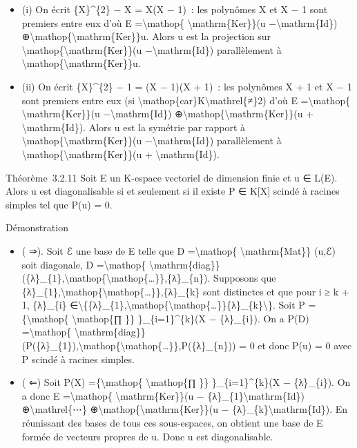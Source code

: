 \documentclass[]{article}
\begin{document}
\begin{itemize}
\itemsep1pt\parskip0pt
\item
  (i) On écrit \{X\}\^{}\{2\} − X = X(X − 1)~: les polynômes X et X − 1
  sont premiers entre eux d'où E =\textbackslash{}mathop\{
  \textbackslash{}mathrm\{Ker\}\}(u −\textbackslash{}mathrm\{Id\})
  ⊕\textbackslash{}mathop\{\textbackslash{}mathrm\{Ker\}\}u. Alors u est
  la projection sur
  \textbackslash{}mathop\{\textbackslash{}mathrm\{Ker\}\}(u
  −\textbackslash{}mathrm\{Id\}) parallèlement à
  \textbackslash{}mathop\{\textbackslash{}mathrm\{Ker\}\}u.
\item
  (ii) On écrit \{X\}\^{}\{2\} − 1 = (X − 1)(X + 1)~: les polynômes X +
  1 et X − 1 sont premiers entre eux (si
  \textbackslash{}mathop\{car\}K\textbackslash{}mathrel\{≠\}2) d'où E
  =\textbackslash{}mathop\{ \textbackslash{}mathrm\{Ker\}\}(u
  −\textbackslash{}mathrm\{Id\})
  ⊕\textbackslash{}mathop\{\textbackslash{}mathrm\{Ker\}\}(u +
  \textbackslash{}mathrm\{Id\}). Alors u est la symétrie par rapport à
  \textbackslash{}mathop\{\textbackslash{}mathrm\{Ker\}\}(u
  −\textbackslash{}mathrm\{Id\}) parallèlement à
  \textbackslash{}mathop\{\textbackslash{}mathrm\{Ker\}\}(u +
  \textbackslash{}mathrm\{Id\}).
\end{itemize}

Théorème~3.2.11 Soit E un K-espace vectoriel de dimension finie et u ∈
L(E). Alors u est diagonalisable si et seulement si il existe P ∈
K{[}X{]} scindé à racines simples tel que P(u) = 0.

Démonstration

\begin{itemize}
\itemsep1pt\parskip0pt
\item
  ( ⇒). Soit ℰ une base de E telle que D =\textbackslash{}mathop\{
  \textbackslash{}mathrm\{Mat\}\} (u,ℰ) soit diagonale, D
  =\textbackslash{}mathop\{
  \textbackslash{}mathrm\{diag\}\}(\{λ\}\_\{1\},\textbackslash{}mathop\{\textbackslash{}mathop\{\ldots{}\}\},\{λ\}\_\{n\}).
  Supposons que
  \{λ\}\_\{1\},\textbackslash{}mathop\{\textbackslash{}mathop\{\ldots{}\}\},\{λ\}\_\{k\}
  sont distinctes et que pour i ≥ k + 1, \{λ\}\_\{i\}
  ∈\textbackslash{}\{\{λ\}\_\{1\},\textbackslash{}mathop\{\textbackslash{}mathop\{\ldots{}\}\}\{λ\}\_\{k\}\textbackslash{}\}.
  Soit P =\{\textbackslash{}mathop\{ \textbackslash{}mathop\{∏ \}\}
  \}\_\{i=1\}\^{}\{k\}(X − \{λ\}\_\{i\}). On a P(D)
  =\textbackslash{}mathop\{
  \textbackslash{}mathrm\{diag\}\}(P(\{λ\}\_\{1\}),\textbackslash{}mathop\{\textbackslash{}mathop\{\ldots{}\}\},P(\{λ\}\_\{n\}))
  = 0 et donc P(u) = 0 avec P scindé à racines simples.
\item
  ( ⇐) Soit P(X) =\{\textbackslash{}mathop\{ \textbackslash{}mathop\{∏
  \}\} \}\_\{i=1\}\^{}\{k\}(X − \{λ\}\_\{i\}). On a donc E
  =\textbackslash{}mathop\{ \textbackslash{}mathrm\{Ker\}\}(u −
  \{λ\}\_\{1\}\textbackslash{}mathrm\{Id\})
  ⊕\textbackslash{}mathrel\{⋯\}
  ⊕\textbackslash{}mathop\{\textbackslash{}mathrm\{Ker\}\}(u −
  \{λ\}\_\{k\}\textbackslash{}mathrm\{Id\}). En réunissant des bases de
  tous ces sous-espaces, on obtient une base de E formée de vecteurs
  propres de u. Donc u est diagonalisable.
\end{itemize}
\end{document}

